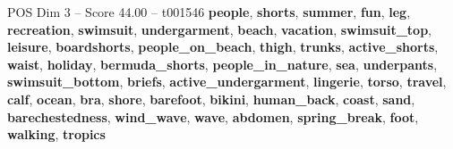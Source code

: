 \begin{textsample}{POS Dim 3 – Score 44.00 – t001546}  \label{ex:f3_pos_001}
\textbf{people}, \textbf{shorts}, \textbf{summer}, \textbf{fun}, \textbf{leg}, \textbf{recreation}, \textbf{swimsuit}, \textbf{undergarment}, \textbf{beach}, \textbf{vacation}, \textbf{swimsuit\_top}, \textbf{leisure}, \textbf{boardshorts}, \textbf{people\_on\_beach}, \textbf{thigh}, \textbf{trunks}, \textbf{active\_shorts}, \textbf{waist}, \textbf{holiday}, \textbf{bermuda\_shorts}, \textbf{people\_in\_nature}, \textbf{sea}, \textbf{underpants}, \textbf{swimsuit\_bottom}, \textbf{briefs}, \textbf{active\_undergarment}, \textbf{lingerie}, \textbf{torso}, \textbf{travel}, \textbf{calf}, \textbf{ocean}, \textbf{bra}, \textbf{shore}, \textbf{barefoot}, \textbf{bikini}, \textbf{human\_back}, \textbf{coast}, \textbf{sand}, \textbf{barechestedness}, \textbf{wind\_wave}, \textbf{wave}, \textbf{abdomen}, \textbf{spring\_break}, \textbf{foot}, \textbf{walking}, \textbf{tropics}

\end{textsample}
